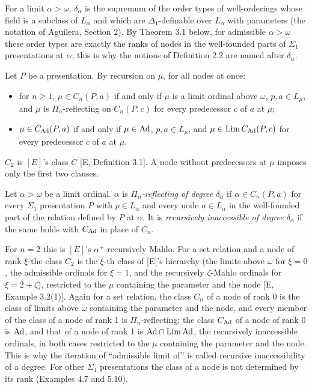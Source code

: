 \documentclass[11pt]{article}
\begin{document}
For a limit $\alpha > \omega$, $\delta_\alpha$ is the supremum of the order types of well-orderings whose field is a
subclass of $L_\alpha$ and which are $\Delta_1$-definable over $L_\alpha$ with parameters (the notation of Aguilera,
Section 2). By Theorem 3.1 below, for admissible $\alpha > \omega$ these order types are exactly the ranks of nodes in
the well-founded parts of $\Sigma_1$ presentations at $\alpha$; this is why the notions of Definition 2.2 are named
after $\delta_\alpha$.

\begin{statement} Let $P$ be a presentation. By recursion on $\mu$, for all nodes at once:
\begin{itemize}
\item for $n \ge 1$, $\mu \in C_n(P, a)$ if and only if $\mu$ is a limit ordinal above $\omega$, $p, a \in L_\mu$,
  and $\mu$ is $\Pi_n$-reflecting on $C_n(P, c)$ for every predecessor $c$ of $a$ at $\mu$;
\item $\mu \in C_{\mathrm{Ad}}(P, a)$ if and only if $\mu \in \mathrm{Ad}$, $p, a \in L_\mu$, and $\mu \in \mathrm{Lim}\, C_{\mathrm{Ad}}(P, c)$ for every
  predecessor $c$ of $a$ at $\mu$.
\end{itemize}
\end{statement}

$C_2$ is $[E]$'s class $C$ [E, Definition 3.1]. A node without predecessors at $\mu$ imposes only the first two
clauses.

\begin{statement} Let $\alpha > \omega$ be a limit ordinal. $\alpha$ is \emph{$\Pi_n$-reflecting
of degree $\delta_\alpha$} if $\alpha \in C_n(P, a)$ for every $\Sigma_1$ presentation $P$ with $p \in L_\alpha$ and
every node $a \in L_\alpha$ in the well-founded part of the relation defined by $P$ at $\alpha$. It is
\emph{recursively inaccessible of degree $\delta_\alpha$} if the same holds with $C_{\mathrm{Ad}}$ in place of $C_n$.
\end{statement}

For $n = 2$ this is $[E]$'s $\alpha^+$-recursively Mahlo. For a set relation and a node of rank $\xi$ the class $C_2$
is the $\xi$-th class of [E]'s hierarchy (the limits above $\omega$ for $\xi = 0$, the admissible ordinals for $\xi =
1$, and the recursively $\zeta$-Mahlo ordinals for $\xi = 2+\zeta$), restricted to the $\mu$ containing the parameter and the node [E, Example 3.2(1)]. Again for a set
relation, the class $C_n$ of a node of rank 0 is the class of limits above $\omega$ containing the parameter and the
node, and every member of the
class of a node of rank 1 is $\Pi_n$-reflecting; the class $C_{\mathrm{Ad}}$ of a node of rank 0 is $\mathrm{Ad}$, and that of a node of
rank 1 is $\mathrm{Ad} \cap \mathrm{Lim}\, \mathrm{Ad}$, the recursively inaccessible ordinals, in both cases restricted to the $\mu$ containing
the parameter and the node. This is why the iteration of ``admissible limit of'' is called recursive inaccessibility of a degree. For other $\Sigma_1$ presentations the class of a node is not determined by its
rank (Examples 4.7 and 5.10).
\end{document}
